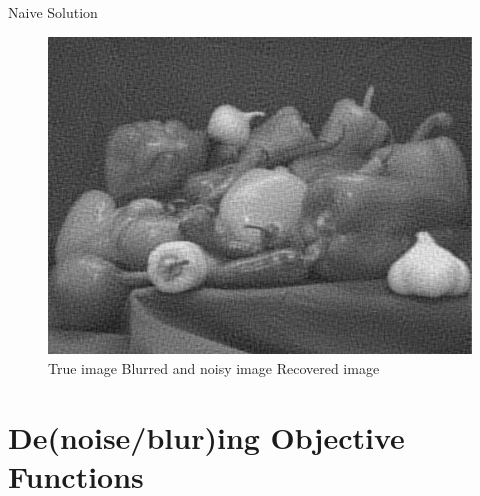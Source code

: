 \documentclass[12pt]{beamer}
\begin{document}
\begin{frame}{Naive Solution}
\begin{figure}
\includegraphics[scale=0.2]{fig5} \\
\small{\hspace{1em} True image \hspace{2em} Blurred and noisy image \hspace{1em} Recovered image}
\end{figure}
\end{frame}

\section{De(noise/blur)ing Objective Functions}
\end{document}
